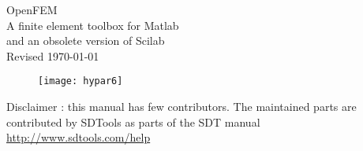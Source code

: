 \documentclass [11pt,twoside] {book}
\begin{document}


 \raggedbottom
 \setlength{\parindent}{0pt}
 \setlength{\parskip}{0pt}
 \setlength{\abovedisplayskip}{0pt plus 0pt minus -6pt}
 \setlength{\belowdisplayskip}{2pt plus 2pt minus 0pt}
 \setlength{\abovedisplayshortskip}{3pt plus 3pt minus -3pt}
 \setlength{\belowdisplayshortskip}{3pt plus 3pt minus 0pt}

\setlength{\unitlength}{18mm}


\fancyhead{}\fancyhf{}
\fancyhead[LE]{\hspace*{-\evensidemargin}\leftmark}
\fancyhead[RO]{}
\fancyfoot[RO]{\thepage}
\fancyfoot[LE]{\hspace*{-\evensidemargin}\thepage}

\renewcommand{\headrulewidth}{0pt}

\frontmatter %


\renewcommand{\chaptermark}[1]{\markboth{\thechapter\ #1}{}}
\renewcommand{\sectionmark}[1]{\markright{#1}}

\nomtcrule\renewcommand{\mtctitle}{}\setlength{\mtcindent}{.1\textwidth}


\thispagestyle{empty}
$ $\\
\begin{center}
\Huge{OpenFEM\\}
\vspace{1cm}
\huge{A finite element toolbox for Matlab}\\
\small{and an obsolete version of Scilab}\\
Revised \today
\vspace{-2cm}
\begin{figure}[H]
 \begin{center}
 \texttt{[image: hypar6]}
 \end{center}
\end{figure}
\vspace{-1cm}
\large{Disclaimer : this manual has few contributors. The maintained
  parts are contributed by SDTools as parts of the SDT manual
  \url{http://www.sdtools.com/help}}
%
\end{center}
\end{document}
